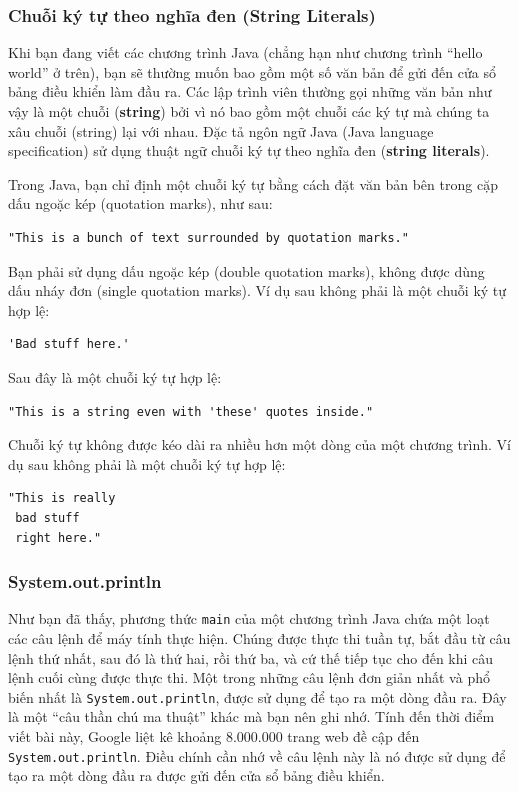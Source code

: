 \subsubsection{Chuỗi ký tự theo nghĩa đen (String
Literals)}\label{chuux1ed7i-kuxfd-tux1ef1-theo-nghux129a-ux111en-string-literals}

Khi bạn đang viết các chương trình Java (chẳng hạn như chương trình
``hello world'' ở trên), bạn sẽ thường muốn bao gồm một số văn bản để
gửi đến cửa sổ bảng điều khiển làm đầu ra. Các lập trình viên thường gọi
những văn bản như vậy là một chuỗi (\textbf{string}) bởi vì nó bao gồm
một chuỗi các ký tự mà chúng ta xâu chuỗi (string) lại với nhau. Đặc tả
ngôn ngữ Java (Java language specification) sử dụng thuật ngữ chuỗi ký
tự theo nghĩa đen (\textbf{string literals}).

Trong Java, bạn chỉ định một chuỗi ký tự bằng cách đặt văn bản bên trong
cặp dấu ngoặc kép (quotation marks), như sau:

\begin{verbatim}
"This is a bunch of text surrounded by quotation marks."
\end{verbatim}

Bạn phải sử dụng dấu ngoặc kép (double quotation marks), không được dùng
dấu nháy đơn (single quotation marks). Ví dụ sau không phải là một chuỗi
ký tự hợp lệ:

\begin{verbatim}
'Bad stuff here.'
\end{verbatim}

Sau đây là một chuỗi ký tự hợp lệ:

\begin{verbatim}
"This is a string even with 'these' quotes inside."
\end{verbatim}

Chuỗi ký tự không được kéo dài ra nhiều hơn một dòng của một chương
trình. Ví dụ sau không phải là một chuỗi ký tự hợp lệ:

\begin{verbatim}
"This is really
 bad stuff
 right here."
\end{verbatim}

\subsubsection{System.out.println}\label{system.out.println}

Như bạn đã thấy, phương thức \texttt{main} của một chương trình Java
chứa một loạt các câu lệnh để máy tính thực hiện. Chúng được thực thi
tuần tự, bắt đầu từ câu lệnh thứ nhất, sau đó là thứ hai, rồi thứ ba, và
cứ thế tiếp tục cho đến khi câu lệnh cuối cùng được thực thi. Một trong
những câu lệnh đơn giản nhất và phổ biến nhất là
\texttt{System.out.println}, được sử dụng để tạo ra một dòng đầu ra. Đây
là một ``câu thần chú ma thuật'' khác mà bạn nên ghi nhớ. Tính đến thời
điểm viết bài này, Google liệt kê khoảng 8.000.000 trang web đề cập đến
\texttt{System.out.println}. Điều chính cần nhớ về câu lệnh này là nó
được sử dụng để tạo ra một dòng đầu ra được gửi đến cửa sổ bảng điều
khiển.

